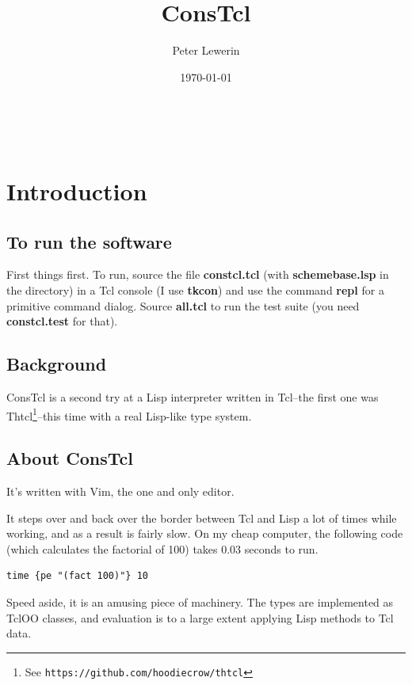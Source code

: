\documentclass[twoside,9pt]{report}
\title{ConsTcl}
\author{Peter Lewerin}
\date{\today}
\begin{document}
\pagestyle{headings}
\maketitle
\tableofcontents
 
\chapter{Introduction}
\label{introduction}
\section{To run the software}
\label{to-run-the-software}

First things first. To run, source the file \textbf{constcl.tcl} (with \textbf{schemebase.lsp} in the directory) in a Tcl console (I use \textbf{tkcon}) and use the command \textbf{repl} for a primitive command dialog. Source \textbf{all.tcl} to run the test suite (you need \textbf{constcl.test} for that).

\section{Background}
\label{background}

ConsTcl is a second try at a Lisp interpreter written in Tcl--the first one was Thtcl\footnote{See \texttt{https://github.com/hoodiecrow/thtcl}}--this time with a real Lisp-like type system.

\section{About ConsTcl}
\label{about-constcl}

It's written with Vim, the one and only editor.


It steps over and back over the border between Tcl and Lisp a lot of times while working, and as a result is fairly slow. On my cheap computer, the following code (which calculates the factorial of 100) takes 0.03 seconds to run.

\noindent\makebox[\linewidth]{\rule{\linewidth}{0.4pt}}
\begin{lstlisting}
time {pe "(fact 100)"} 10
\end{lstlisting}
\noindent\makebox[\linewidth]{\rule{\linewidth}{0.4pt}}

Speed aside, it is an amusing piece of machinery. The types are implemented as TclOO classes, and evaluation is to a large extent applying Lisp methods to Tcl data.
\end{document}
